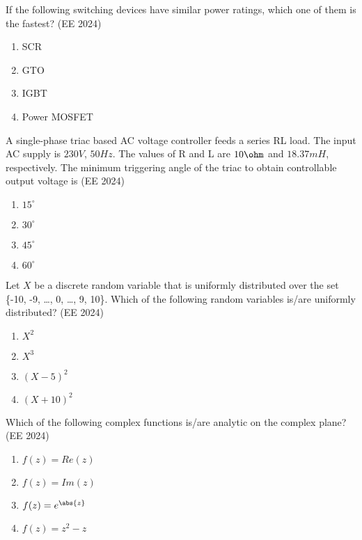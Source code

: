 \iffalse
\title{EE-2024-27-39}
\author{EE24BTECH11041-Mohit}
\section{EE}
\chapter{2024}
\fi

\item If the following switching devices have similar power ratings, which one of them is the fastest?
\hfill{(EE 2024)}
\begin{enumerate}
\item SCR
\item GTO
\item IGBT
\item Power MOSFET
\end{enumerate}
\item  A single-phase triac based AC voltage controller feeds a series RL load. The input AC supply is $230 V$, $50 Hz$. The values of R and L are $10 \ohm$ and $18.37 mH$, respectively. The minimum triggering angle of the triac to obtain controllable output voltage is
\hfill{(EE 2024)}
\begin{enumerate}
\item $15^{\circ}$
\item $30^{\circ}$
\item $45^{\circ}$
\item $60^{\circ}$
\end{enumerate}
\item Let $X$ be a discrete random variable that is uniformly distributed over the set
\{-10, -9, \dots , 0, \dots , 9, 10\}. Which of the following random variables is/are
uniformly distributed?
\hfill{(EE 2024)}
\begin{enumerate}
\item $X^2$
\item $X^3$
\item $(X-5)^2$
\item $(X+10)^2$
\end{enumerate}
\item Which of the following complex functions is/are analytic on the complex plane?
\hfill{(EE 2024)}
\begin{enumerate}
\item $f(z)=Re(z)$
\item $f(z)=Im(z)$
\item $f(z)=e^{\abs{z}}$
\item $f(z)=z^2-z$
\end{enumerate}
